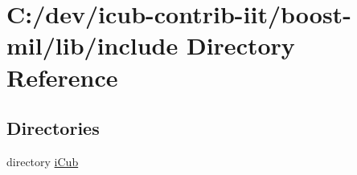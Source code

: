 \section{C\+:/dev/icub-\/contrib-\/iit/boost-\/mil/lib/include Directory Reference}
\label{dir_5a30104352ef4255dc24354b02eb2d20}
\subsection*{Directories}
\begin{DoxyCompactItemize}
\item 
directory \hyperlink{dir_05906369c2d654c318c8e5f0b9121080}{i\+Cub}
\end{DoxyCompactItemize}
